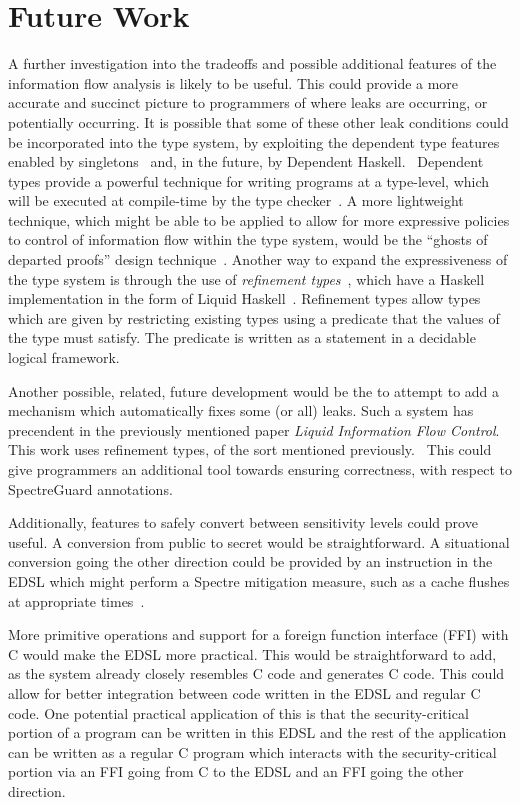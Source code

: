 \documentclass[10pt, conference]{IEEEtran}
\begin{document}
\section{Future Work}
\label{sec:FutureWork}
A further investigation into the tradeoffs and possible additional features of
the information flow analysis is likely to be useful. This could provide a more
accurate and succinct picture to programmers of where leaks are occurring, or
potentially occurring. It is possible that some of these other leak conditions
could be incorporated into the type system, by exploiting the dependent type
features enabled by singletons~\cite{Singletons} and, in the future, by
Dependent Haskell.~\cite{DepHaskSpec} Dependent types provide a powerful
technique for writing programs at a type-level, which will be executed at
compile-time by the type checker~\cite{CertProg, DepHaskSpec}. A more
lightweight technique, which might be able to be applied to allow for more
expressive policies to control of information flow within the type system, would
be the ``ghosts of departed proofs'' design technique~\cite{DepartedProofs}. Another
way to expand the expressiveness of the type system is through the use of \textit{refinement
types}~\cite{RefinementTypes}, which have a Haskell implementation in the form of Liquid Haskell~\cite{LiquidHaskell}.
Refinement types allow types which are given by restricting existing types using a predicate that
the values of the type must satisfy. The predicate is written as a statement in
a decidable logical framework.

Another possible, related, future development would be the to attempt to add a
mechanism which automatically fixes some (or all) leaks. Such a system has precendent
in the previously mentioned paper \textit{Liquid Information Flow Control}. This work uses refinement types, of the sort mentioned previously.~\cite{Lifty}
This could give programmers an additional tool towards ensuring correctness, with
respect to SpectreGuard annotations.

Additionally, features to safely convert between sensitivity levels could prove
useful. A conversion from public to secret would be straightforward. A situational conversion
going the other direction could be provided by an instruction in the EDSL
which might perform a Spectre mitigation measure, such as a cache flushes at appropriate times~\cite{PLtea-james}.

More primitive operations and support for a foreign function interface (FFI)
with C would make the EDSL more practical. This would be straightforward to add,
as the system already closely resembles C code and generates C code. This could allow
for better integration between code written in the EDSL and regular C code. One potential
practical application of this is that the security-critical portion of a program
can be written in this EDSL and the rest of the application can be written as a regular
C program which interacts with the security-critical portion via an FFI going from C to
the EDSL and an FFI going the other direction.
\end{document}
